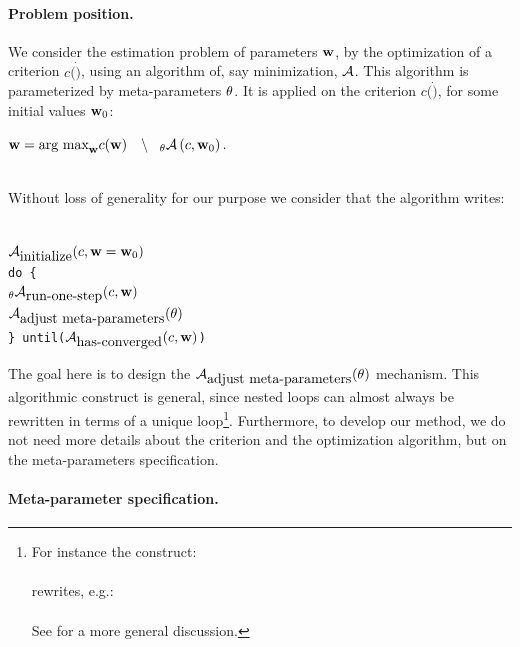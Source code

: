 \documentclass{article}
\newcommand{\eqline}[1]{\\\centerline{$#1$}\\}
\begin{document}
\paragraph{Problem position.}

We consider the estimation problem of parameters ${\bf w}$, by the optimization of a criterion $c(\dot)$, using an algorithm of, say minimization, ${\cal A}$. This algorithm is parameterized by meta-parameters ${\bf \theta}$. It is applied on the criterion $c(\dot)$, for some initial values ${\bf w}_0$:
\eqline{{\bf w} = \mbox{arg max}_{\bf w} c({\bf w}) \;\;\;\left\backslash \;\;\; {}_{\bf \theta}{\cal A}\left(c, {\bf w}_0\right). \right.}

Without loss of generality for our purpose we consider that the algorithm writes: 

{\tt ~
\\\indent ${\cal A}_{\mbox{initialize}}(c, {\bf w} = {\bf w}_0)$
\\\indent do \{
\\\indent \indent ${}_{\bf \theta}{\cal A}_{\mbox{run-one-step}}(c, {\bf w})$
\\\indent \indent ${\cal A}_{\mbox{adjust meta-parameters}}({\bf \theta})$
\\\indent \} until(${\cal A}_{\mbox{has-converged}}(c, {\bf w})$)
\\
}

The goal here is to design the ${\cal A}_{\mbox{adjust meta-parameters}}({\bf \theta})$ mechanism. This algorithmic construct is general, since nested loops can almost always be rewritten in terms of a unique loop\footnote{For instance the construct:
\\
\\rewrites, e.g.:
\\
\\ See \cite{collard2007reasoning} for a more general discussion.}. Furthermore, to develop our method, we do not need more details about the criterion and the optimization algorithm, but on the meta-parameters specification. 

\paragraph{Meta-parameter specification.}
\end{document}
